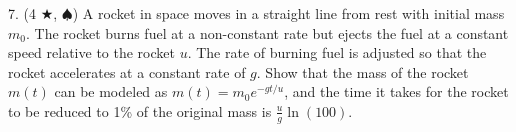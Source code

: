 7. (4 $\bigstar$, $\spadesuit$) A rocket in space moves in a straight line from rest with initial mass $m_0$. The rocket burns fuel at a non-constant rate but ejects the fuel at a constant speed relative to the rocket $u$. The rate of burning fuel is adjusted so that the rocket accelerates at a constant rate of $g$. Show that the mass of the rocket $m(t)$ can be modeled as $m(t) = m_0 e^{-gt/u}$, and the time it takes for the rocket to be reduced to 1\% of the original mass is $\frac{u}{g}\ln(100)$.

\pagebreak